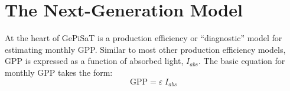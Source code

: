 %
%
%
%
%
\section{The Next-Generation Model}
\label{sec:nxtgen}
At the heart of GePiSaT is a production efficiency or ``diagnostic'' model for estimating monthly GPP. 
Similar to most other production efficiency models, GPP is expressed as a function of absorbed light, $I_{abs}$.
The basic equation for monthly GPP takes the form:
\begin{equation}
\label{eq:pem}
    \text{GPP} = \varepsilon\; I_{abs} 
\end{equation}

